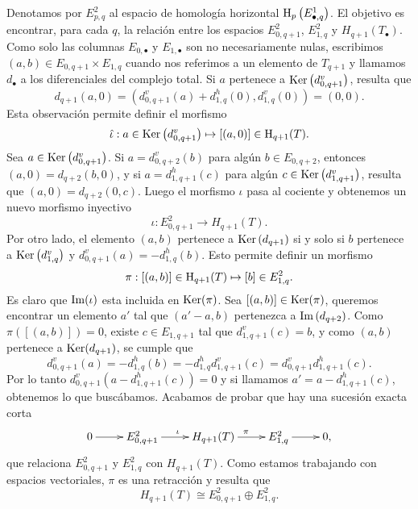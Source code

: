 \documentclass[a4paper,oneside,fleqn,11pt,../tesis.tex]{subfiles}
\begin{document}
Denotamos por $E_{p, q}^2$ al espacio de homología horizontal $\operatorname{H}_{p}\left(E_{\bullet, q}^{1}\right)$. El objetivo
es encontrar, para cada $q$, la relación entre los espacios $E_{0, q + 1}^{2}$,  $E_{1, q}^{2}$ y $H_{q + 1}(T_{\bullet})$.
Como solo las columnas $E_{0, \bullet}$ y $E_{1, \bullet}$ son no necesariamente nulas, escribimos $(a, b) \in E_{0, q + 1} \times E_{1, q}$ cuando nos referimos
a un elemento de $T_{q + 1}$ y llamamos $d_{\bullet}$ a los diferenciales del complejo total.
Si $a$ pertenece a $\operatorname{Ker}\left(d_{0,q + 1}^{v}\right)$, resulta que
\[
    d_{q + 1}(a, 0) = \left(d_{0, q + 1}^{v}(a) + d_{1, q}^{h}(0), d_{1, q}^{v}(0)\right) = (0, 0).
\]
Esta observación permite definir el morfismo
\[
    \hat{\iota}: a \in \operatorname{Ker}\left(d_{0,q + 1}^{v}\right) \mapsto  [(a, 0)] \in \operatorname{H}_{q + 1}(T).
\]
Sea $a \in \operatorname{Ker}\left(d_{0,q + 1}^{v}\right)$. Si $a = d_{0, q + 2}^{v}(b)$ para algún $b \in E_{0, q + 2}$, entonces $(a, 0) = d_{q + 2}(b, 0)$,
y si $a = d_{1, q + 1}^{h}(c)$ para algún $c \in \operatorname{Ker}\left(d_{1, q + 1}^{v}\right)$, resulta que $(a, 0) = d_{q + 2}(0, c)$. Luego 
el morfismo $\hat{\iota}$ pasa al cociente y obtenemos un nuevo morfismo inyectivo
\[
    \iota: E_{0, q + 1}^{2} \to H_{q + 1}(T).
\]
Por otro lado, el elemento $(a, b)$ pertenece a $\operatorname{Ker}\left(d_{q + 1}\right)$ si y solo si $b$ pertenece a $\operatorname{Ker}\left(d_{1, q}^{v}\right)$
y $d_{0, q + 1}^{v}(a) = - d_{1, q}^{h}(b)$. Esto permite definir un morfismo
\[
    \pi: [(a, b)] \in \operatorname{H}_{q + 1}(T)  \mapsto  [b] \in E_{1, q}^{2}.
\]
Es claro que $\operatorname{Im}(\iota)$ esta incluida en $\operatorname{Ker}(\pi)$. Sea $[(a, b)] \in \operatorname{Ker}(\pi)$, queremos encontrar un elemento $a'$ tal que
$(a' - a, b)$ pertenezca a $\operatorname{Im}\left(d_{q + 2}\right)$. Como $\pi([(a, b)]) = 0$, existe $c \in E_{1, q + 1}$ tal que $d_{1, q + 1}^{v}(c) = b$,
y como $(a, b)$ pertenece a $\operatorname{Ker}(d_{q + 1})$, se cumple que
\[
    d_{0, q + 1}^{v}(a) = -d_{1, q}^{h}(b) = -d_{1, q}^{h} d_{1, q + 1}^{v}(c) = d_{0, q + 1}^{v} d_{1, q+ 1}^{h}(c).
\]
Por lo tanto $d_{0, q + 1}^{v} \left(a - d_{1, q+ 1}^{h}(c)\right) = 0$ y si llamamos $a' = a - d_{1, q+ 1}^{h}(c)$, obtenemos lo que buscábamos.
Acabamos de probar que hay una sucesión exacta corta
\begin{align*}
\xymatrix{
    0 \ar[r] & E_{0, q + 1}^{2} \ar[r]^{\iota} & H_{q + 1}(T) \ar[r]^{\pi} & E_{1, q }^{2} \ar[r] & 0,
}
\end{align*}
que relaciona $E_{0, q + 1}^{2}$ y $E_{1, q}^{2}$ con $H_{q + 1}(T)$. Como estamos trabajando con espacios vectoriales, $\pi$ es una retracción y
resulta que
\[
    H_{q + 1}(T) \cong E_{0, q + 1}^{2} \oplus E_{1, q}^{2}.
\]
\end{document}
